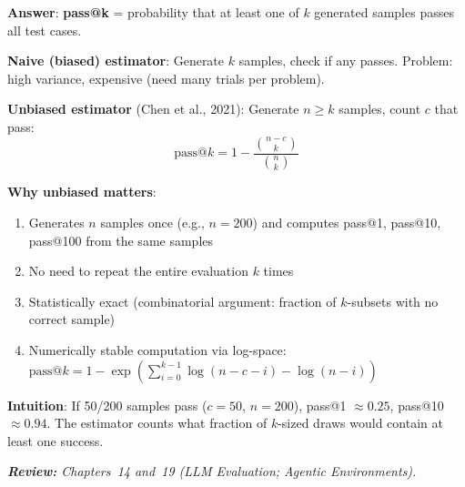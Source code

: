 \begin{questionbox}
\textbf{Answer}: \textbf{pass@k} = probability that at least one of $k$ generated samples passes all test cases.

\textbf{Naive (biased) estimator}: Generate $k$ samples, check if any passes. Problem: high variance, expensive (need many trials per problem).

\textbf{Unbiased estimator} (Chen et al., 2021): Generate $n \geq k$ samples, count $c$ that pass: 
\[
\text{pass@}k = 1 - \frac{\binom{n-c}{k}}{\binom{n}{k}}
\]

\textbf{Why unbiased matters}:

\begin{enumerate}
  \item Generates $n$ samples once (e.g., $n=200$) and computes pass@1, pass@10, pass@100 from the same samples
  \item No need to repeat the entire evaluation $k$ times
  \item Statistically exact (combinatorial argument: fraction of $k$-subsets with no correct sample)
  \item Numerically stable computation via log-space: $\text{pass@}k = 1 - \exp\left(\sum_{i=0}^{k-1} \log(n-c-i) - \log(n-i)\right)$
\end{enumerate}

\textbf{Intuition}: If 50/200 samples pass ($c=50$, $n=200$), pass@1 $\approx 0.25$, pass@10 $\approx 0.94$. The estimator counts what fraction of $k$-sized draws would contain at least one success.

\emph{\textbf{Review:} Chapters~14 and~19 (LLM Evaluation; Agentic Environments).}
\end{questionbox}

